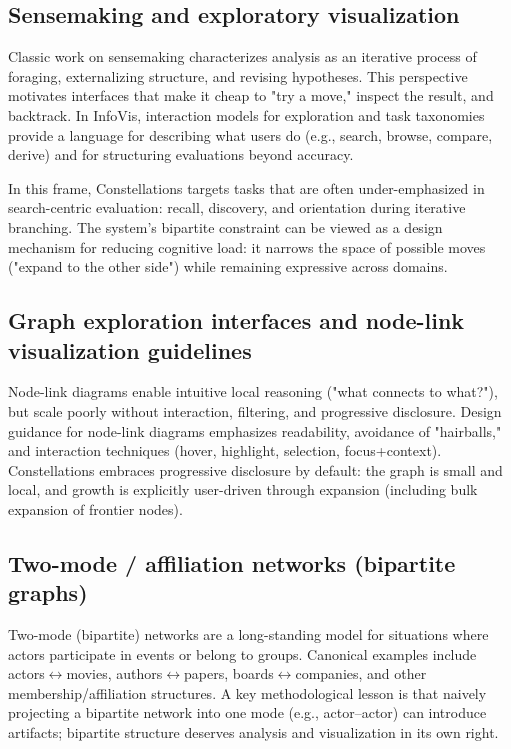 \subsection{Sensemaking and exploratory visualization}

Classic work on sensemaking characterizes analysis as an iterative process of foraging, externalizing structure, and revising hypotheses. This perspective motivates interfaces that make it cheap to "try a move," inspect the result, and backtrack. In InfoVis, interaction models for exploration and task taxonomies provide a language for describing what users do (e.g., search, browse, compare, derive) and for structuring evaluations beyond accuracy.

In this frame, Constellations targets tasks that are often under-emphasized in search-centric evaluation: recall, discovery, and orientation during iterative branching. The system's bipartite constraint can be viewed as a design mechanism for reducing cognitive load: it narrows the space of possible moves ("expand to the other side") while remaining expressive across domains.

\subsection{Graph exploration interfaces and node-link visualization guidelines}

Node-link diagrams enable intuitive local reasoning ("what connects to what?"), but scale poorly without interaction, filtering, and progressive disclosure. Design guidance for node-link diagrams emphasizes readability, avoidance of "hairballs," and interaction techniques (hover, highlight, selection, focus+context). Constellations embraces progressive disclosure by default: the graph is small and local, and growth is explicitly user-driven through expansion (including bulk expansion of frontier nodes).

\subsection{Two-mode / affiliation networks (bipartite graphs)}

Two-mode (bipartite) networks are a long-standing model for situations where actors participate in events or belong to groups. Canonical examples include actors\(\leftrightarrow\)movies, authors\(\leftrightarrow\)papers, boards\(\leftrightarrow\)companies, and other membership/affiliation structures. A key methodological lesson is that naively projecting a bipartite network into one mode (e.g., actor--actor) can introduce artifacts; bipartite structure deserves analysis and visualization in its own right.

